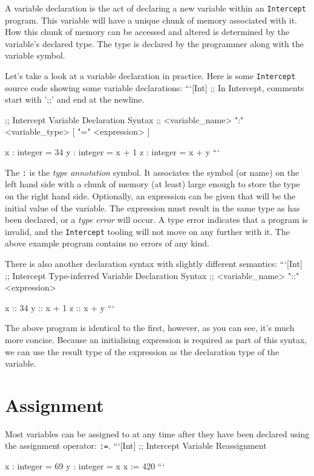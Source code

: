 \documentclass[12pt]{report}
\begin{document}
A variable declaration is the act of declaring a new variable within an \verb|Intercept| program. This variable will have a unique chunk of memory associated with it. How this chunk of memory can be accessed and altered is determined by the variable's declared type. The type is declared by the programmer along with the variable symbol.

Let's take a look at a variable declaration in practice. Here is some \verb|Intercept| source code showing some variable declarations:
```[Int]
;; In Intercept, comments start with ';;' and end at the newline.

;; Intercept Variable Declaration Syntax
;; <variable_name> ":" <variable_type> [ "=" <expression> ]

x : integer = 34
y : integer = x + 1
z : integer = x + y
```

The \verb|:| is the \emph{type annotation} symbol. It associates the symbol (or name) on the left hand side with a chunk of memory (at least) large enough to store the type on the right hand side. Optionally, an expression can be given that will be the initial value of the variable. The expression must result in the same type as has been declared, or a \emph{type error} will occur. A type error indicates that a program is invalid, and the \verb|Intercept| tooling will not move on any further with it. The above example program contains no errors of any kind.

There is also another declaration syntax with slightly different semantics:
```[Int]
;; Intercept Type-inferred Variable Declaration Syntax
;; <variable_name> "::" <expression>

x :: 34
y :: x + 1
z :: x + y
```

The above program is identical to the first, however, as you can see, it's much more concise. Because an initialising expression is required as part of this syntax, we can use the result type of the expression as the declaration type of the variable.

\section*{Assignment}
\label{sec:variables-assignment}

Most variables can be assigned to at any time after they have been declared using the assignment operator: \verb|:=|.
```[Int]
;; Intercept Variable Reassignment

x : integer = 69
y : integer = x
x := 420
```
\end{document}
